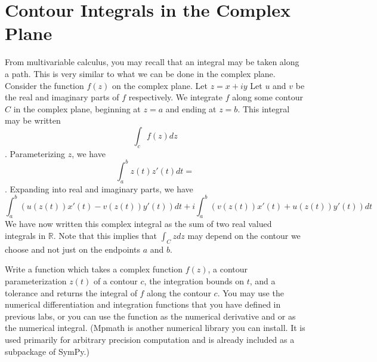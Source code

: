

\section*{Contour Integrals in the Complex Plane}

From multivariable calculus, you may recall that an integral may be taken along a path.
This is very similar to what we can be done in the complex plane.
Consider the function $f(z)$ on the complex plane.
Let $z=x+iy$ Let $u$ and $v$ be the real and imaginary parts of $f$ respectively.
We integrate $f$ along some contour $C$ in the complex plane, beginning at $z=a$ and ending at $z=b$.
This integral may be written $$\int_c f(z)dz$$.
Parameterizing $z$, we have $$\int_a^b z(t)z'(t)dt=$$.
Expanding into real and imaginary parts, we have
$$\int_a^b (u(z(t))x'(t)-v(z(t))y'(t))dt +i \int_a^b(v(z(t))x'(t)+u(z(t))y'(t))dt$$
We have now written this complex integral as the sum of two real valued integrals in $\mathbb{R}$.
Note that this implies that $\int_C z dz$ may depend on the contour we choose and not just on the endpoints $a$ and $b$.

\begin{problem}
Write a function which takes a complex function $f(z)$, a contour parameterization $z(t)$ of a contour $c$, the integration bounds on $t$, and a tolerance and returns the integral of $f$ along the contour $c$. 
You may use the numerical differentiation and integration functions that you have defined in previous labs, or you can use the function  as the numerical derivative and  or  as the numerical integral.
(Mpmath is another numerical library you can install.
It is used primarily for arbitrary precision computation and is already included as a subpackage of SymPy.)
\end {problem}

